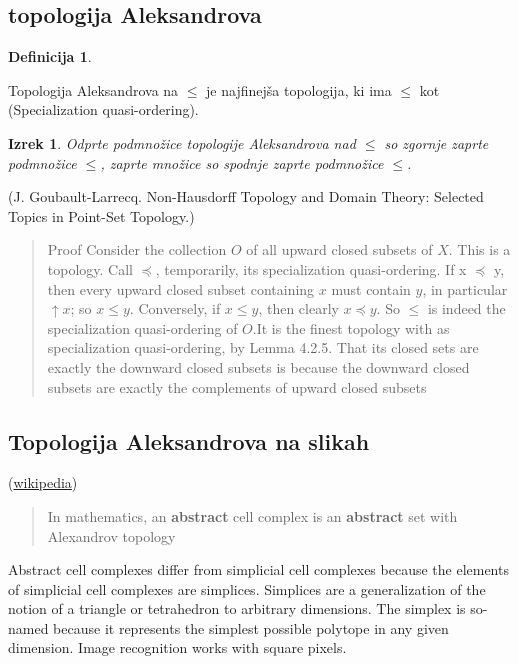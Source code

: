 \documentclass[mat1]{fmfdelo}
\newtheorem{definition}{Definicija}[subsection]
\newtheorem{theorem}{Izrek}[subsection]
\begin{document}
\subsection{topologija Aleksandrova}
\begin{definition}
  
\end{definition}
Topologija Aleksandrova na $\leq$ je najfinejša topologija,
ki ima $\leq$ kot (Specialization quasi-ordering).
\begin{theorem}
  Odprte podmnožice topologije Aleksandrova nad $\leq$ so zgornje zaprte podmnožice $\leq$, zaprte množice so spodnje zaprte podmnožice $\leq$.
\end{theorem}
(J. Goubault-Larrecq. Non-Hausdorff Topology and Domain Theory: Selected Topics in Point-Set Topology.)
\begin{quote}
  Proof Consider the collection $O$ of all upward closed subsets of $X$. This is a
  topology. Call $\preceq$, temporarily, its specialization quasi-ordering. If x $\preceq$ y, then
  every upward closed subset containing $x$ must contain $y$, in particular $\uparrow x$; so
  $x \leq y$. Conversely, if $x \leq y$, then clearly $x \preceq y$.
  So $\leq$ is indeed the specialization quasi-ordering of $O$.It is the finest topology with  as specialization
  quasi-ordering, by Lemma 4.2.5. That its closed sets are exactly the downward closed subsets
  is because the downward closed subsets are exactly the complements of upward closed subsets
\end{quote}
\subsection{Topologija Aleksandrova na slikah}
(\href{https://en.wikipedia.org/wiki/Abstract_cell_complex}{wikipedia})
\begin{quote}
  In mathematics, an \textbf{abstract} cell complex is an \textbf{abstract} set with Alexandrov topology
\end{quote}
Abstract cell complexes differ from simplicial cell complexes because the
elements of simplicial cell complexes are simplices. Simplices are
a generalization of the notion of a triangle or tetrahedron to arbitrary dimensions. 
The simplex is so-named because it represents the simplest possible polytope in any given dimension.
Image recognition works with square pixels.
\end{document}
